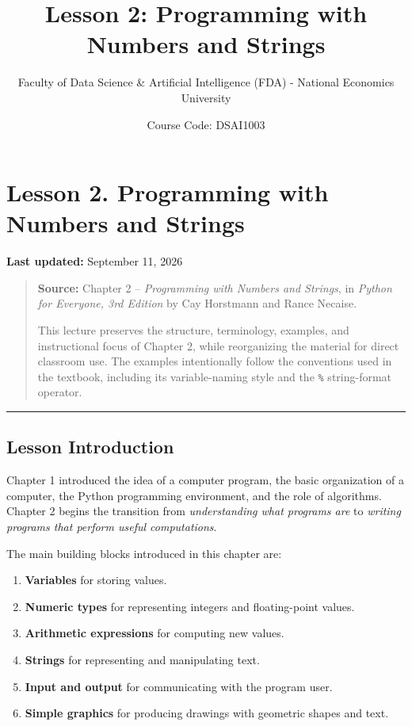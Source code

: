\documentclass[
]{article}
\title{Lesson 2: Programming with Numbers and Strings}
\author{Faculty of Data Science \& Artificial Intelligence (FDA) -
National Economics University}
\date{Course Code: DSAI1003}
\providecommand{\tightlist}{%
  \setlength{\itemsep}{0pt}\setlength{\parskip}{0pt}}
\begin{document}
\maketitle

{
\setcounter{tocdepth}{3}
\tableofcontents
}
\section{Lesson 2. Programming with Numbers and
Strings}\label{lesson-2.-programming-with-numbers-and-strings}

\textbf{Last updated:} September 11, 2026

\begin{quote}
\textbf{Source:} Chapter 2 -- \emph{Programming with Numbers and
Strings}, in \emph{Python for Everyone, 3rd Edition} by Cay Horstmann
and Rance Necaise.

This lecture preserves the structure, terminology, examples, and
instructional focus of Chapter 2, while reorganizing the material for
direct classroom use. The examples intentionally follow the conventions
used in the textbook, including its variable-naming style and the
\texttt{\%} string-format operator.
\end{quote}

\begin{center}\rule{0.5\linewidth}{0.5pt}\end{center}

\subsection{Lesson Introduction}\label{lesson-introduction}

Chapter 1 introduced the idea of a computer program, the basic
organization of a computer, the Python programming environment, and the
role of algorithms. Chapter 2 begins the transition from
\emph{understanding what programs are} to \emph{writing programs that
perform useful computations}.

The main building blocks introduced in this chapter are:

\begin{enumerate}
\def\labelenumi{\arabic{enumi}.}
\tightlist
\item
  \textbf{Variables} for storing values.
\item
  \textbf{Numeric types} for representing integers and floating-point
  values.
\item
  \textbf{Arithmetic expressions} for computing new values.
\item
  \textbf{Strings} for representing and manipulating text.
\item
  \textbf{Input and output} for communicating with the program user.
\item
  \textbf{Simple graphics} for producing drawings with geometric shapes
  and text.
\end{enumerate}
\end{document}
